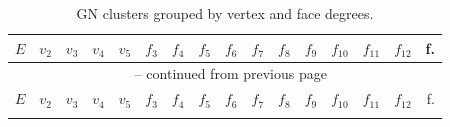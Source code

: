\begin{appendix}
\footnotesize{\begin{longtable}{lrrrrrrrrrrrrrrr}
    \caption{\ac{GN} clusters grouped by vertex and face degrees.}
    \label{tab:verticesandfaces}\\
\toprule    
    $E$ & $v_2$ & $v_3$ & $v_4$ & $v_5$ & $f_3$ & $f_4$ & $f_5$ & $f_6$ & $f_7$ & $f_8$ & $f_9$ & $f_{10}$ & $f_{11}$ & $f_{12}$ & f. \\\midrule
\endfirsthead

\multicolumn{16}{c}{\tablename~\thetable{} -- continued from previous page}\\
\toprule
    $E$ & $v_2$ & $v_3$ & $v_4$ & $v_5$ & $f_3$ & $f_4$ & $f_5$ & $f_6$ & $f_7$ & $f_8$ & $f_9$ & $f_{10}$ & $f_{11}$ & $f_{12}$ & f. \\\midrule
\endhead

\bottomrule\endfoot


\end{longtable}}
\end{appendix}
